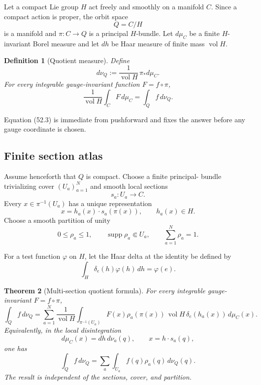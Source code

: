 \documentclass[11pt]{article}
\newtheorem{theorem}{Theorem}[section]
\newtheorem{definition}[theorem]{Definition}
\begin{document}
Let a compact Lie group \(H\) act freely and smoothly on a manifold
\(C\).  Since a compact action is proper, the orbit space
\[
                             Q=C/H                             \tag{52.1}
\]
is a manifold and \(\pi:C\to Q\) is a principal \(H\)-bundle.
Let \(d\mu_C\) be a finite \(H\)-invariant Borel measure and let \(dh\)
be Haar measure of finite mass \(\operatorname{vol}H\).

\begin{definition}[Quotient measure]
\label{def:v11v52-quotient}
Define
\[
                        d\nu_Q
                  :=\frac1{\operatorname{vol}H}\,\pi_*d\mu_C. \tag{52.2}
\]
For every integrable gauge-invariant function
\(F=f\circ\pi\),
\[
 \frac1{\operatorname{vol}H}\int_CF\,d\mu_C
                         =\int_Qf\,d\nu_Q.                    \tag{52.3}
\]
\end{definition}

Equation (52.3) is immediate from pushforward and fixes the answer
before any gauge coordinate is chosen.

\subsection{Finite section atlas}

Assume henceforth that \(Q\) is compact.  Choose a finite principal-
bundle trivializing cover \((U_a)_{a=1}^N\) and smooth local sections
\[
                            s_a:U_a\to C.                      \tag{52.4}
\]
Every \(x\in\pi^{-1}(U_a)\) has a unique representation
\[
                    x=h_a(x)\cdot s_a(\pi(x)),\qquad h_a(x)\in H.
                                                                  \tag{52.5}
\]
Choose a smooth partition of unity
\[
            0\le\rho_a\le1,\qquad
            \operatorname{supp}\rho_a\Subset U_a,\qquad
            \sum_{a=1}^N\rho_a=1.                             \tag{52.6}
\]

For a test function \(\varphi\) on \(H\), let the Haar delta at the
identity be defined by
\[
                         \int_H\delta_e(h)\varphi(h)\,dh
                                  =\varphi(e).                 \tag{52.7}
\]

\begin{theorem}[Multi-section quotient formula]
\label{thm:v11v52-multisection}
For every integrable gauge-invariant \(F=f\circ\pi\),
\[
 \boxed{
 \int_Qf\,d\nu_Q
 =\sum_{a=1}^N\frac1{\operatorname{vol}H}
   \int_{\pi^{-1}(U_a)}
     F(x)\rho_a(\pi(x))\,
     \operatorname{vol}H\,\delta_e(h_a(x))\,d\mu_C(x).}       \tag{52.8}
\]
Equivalently, in the local disintegration
\[
             d\mu_C(x)=dh\,d\nu_a(q),\qquad
             x=h\cdot s_a(q),                                \tag{52.9}
\]
one has
\[
 \int_Qf\,d\nu_Q
 =\sum_a\int_{U_a}f(q)\rho_a(q)\,d\nu_Q(q).                   \tag{52.10}
\]
The result is independent of the sections, cover, and partition.
\end{theorem}
\end{document}
